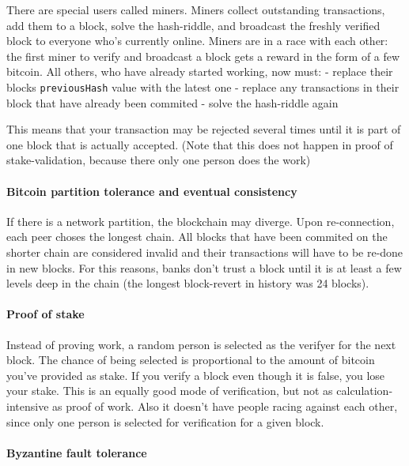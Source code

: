 There are special users called miners. Miners collect outstanding
transactions, add them to a block, solve the hash-riddle, and broadcast
the freshly verified block to everyone who's currently online. Miners
are in a race with each other: the first miner to verify and broadcast a
block gets a reward in the form of a few bitcoin. All others, who have
already started working, now must: - replace their blocks
\texttt{previousHash} value with the latest one - replace any
transactions in their block that have already been commited - solve the
hash-riddle again

This means that your transaction may be rejected several times until it
is part of one block that is actually accepted. (Note that this does not
happen in proof of stake-validation, because there only one person does
the work)

\hypertarget{bitcoin-partition-tolerance-and-eventual-consistency}{%
\paragraph{Bitcoin partition tolerance and eventual
consistency}\label{bitcoin-partition-tolerance-and-eventual-consistency}}

If there is a network partition, the blockchain may diverge. Upon
re-connection, each peer choses the longest chain. All blocks that have
been commited on the shorter chain are considered invalid and their
transactions will have to be re-done in new blocks. For this reasons,
banks don't trust a block until it is at least a few levels deep in the
chain (the longest block-revert in history was 24 blocks).

\hypertarget{proof-of-stake}{%
\paragraph{Proof of stake}\label{proof-of-stake}}

Instead of proving work, a random person is selected as the verifyer for
the next block. The chance of being selected is proportional to the
amount of bitcoin you've provided as stake. If you verify a block even
though it is false, you lose your stake. This is an equally good mode of
verification, but not as calculation-intensive as proof of work. Also it
doesn't have people racing against each other, since only one person is
selected for verification for a given block.

\hypertarget{byzantine-fault-tolerance-2}{%
\paragraph{Byzantine fault
tolerance}\label{byzantine-fault-tolerance-2}}

